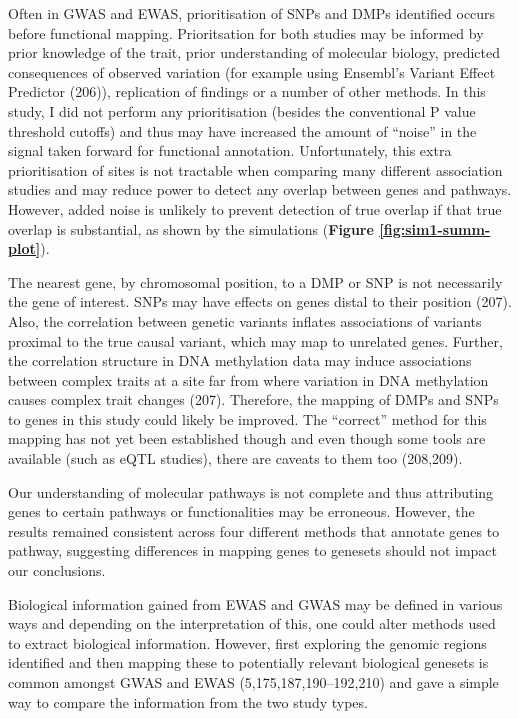 \documentclass[11pt,oneside]{bristolthesis}
\begin{document}
Often in GWAS and EWAS, prioritisation of SNPs and DMPs identified occurs before functional mapping. Prioritsation for both studies may be informed by prior knowledge of the trait, prior understanding of molecular biology, predicted consequences of observed variation (for example using Ensembl's Variant Effect Predictor (206)), replication of findings or a number of other methods. In this study, I did not perform any prioritisation (besides the conventional P value threshold cutoffs) and thus may have increased the amount of ``noise'' in the signal taken forward for functional annotation. Unfortunately, this extra prioritisation of sites is not tractable when comparing many different association studies and may reduce power to detect any overlap between genes and pathways. However, added noise is unlikely to prevent detection of true overlap if that true overlap is substantial, as shown by the simulations (\textbf{Figure \ref{fig:sim1-summ-plot}}).

The nearest gene, by chromosomal position, to a DMP or SNP is not necessarily the gene of interest. SNPs may have effects on genes distal to their position (207). Also, the correlation between genetic variants inflates associations of variants proximal to the true causal variant, which may map to unrelated genes. Further, the correlation structure in DNA methylation data may induce associations between complex traits at a site far from where variation in DNA methylation causes complex trait changes (207). Therefore, the mapping of DMPs and SNPs to genes in this study could likely be improved. The ``correct'' method for this mapping has not yet been established though and even though some tools are available (such as eQTL studies), there are caveats to them too (208,209).

Our understanding of molecular pathways is not complete and thus attributing genes to certain pathways or functionalities may be erroneous. However, the results remained consistent across four different methods that annotate genes to pathway, suggesting differences in mapping genes to genesets should not impact our conclusions.

Biological information gained from EWAS and GWAS may be defined in various ways and depending on the interpretation of this, one could alter methods used to extract biological information. However, first exploring the genomic regions identified and then mapping these to potentially relevant biological genesets is common amongst GWAS and EWAS (5,175,187,190--192,210) and gave a simple way to compare the information from the two study types.
\end{document}
